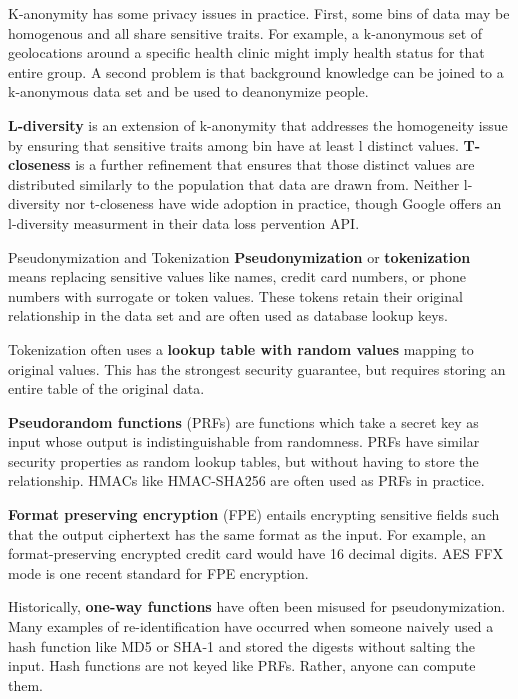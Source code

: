 \documentclass[nobib]{tufte-handout}
\begin{document}
K-anonymity has some privacy issues in practice. First, some bins of data may be
homogenous and all share sensitive traits. For example, a k-anonymous set of
geolocations around a specific health clinic might imply health status for that
entire group. A second problem is that background knowledge can be joined to a
k-anonymous data set and be used to deanonymize people.

\textbf{L-diversity} \cite{DBLP:conf/icde/MachanavajjhalaGKV06} is an extension
of k-anonymity that addresses the homogeneity issue by ensuring that sensitive
traits among bin have at least l distinct values.
\textbf{T-closeness} \cite{DBLP:conf/icde/LiLV07} is a further refinement that
ensures that those distinct values are distributed similarly to the population
that data are drawn from. Neither l-diversity nor t-closeness have wide adoption
in practice, though Google offers an l-diversity measurment in their data loss
pervention API.

Pseudonymization and Tokenization \textbf{Pseudonymization} or
\textbf{tokenization} means replacing sensitive values like names, credit card
numbers, or phone numbers with surrogate or token values. These tokens retain
their original relationship in the data set and are often used as database
lookup keys.

Tokenization often uses a \textbf{lookup table with random values} mapping to
original values. This has the strongest security guarantee, but requires storing
an entire table of the original data.

\textbf{Pseudorandom functions} (PRFs) are functions which take a secret key as
input whose output is indistinguishable from randomness. PRFs have similar
security properties as random lookup tables, but without having to store the
relationship. HMACs like HMAC-SHA256 are often used as PRFs in practice.

\textbf{Format preserving encryption} \cite{DBLP:conf/sacrypt/BellareRRS09} (FPE)
entails encrypting sensitive fields such that the output ciphertext has the same
format as the input. For example, an format-preserving encrypted credit card
would have 16 decimal digits. AES FFX mode \cite{dworkin2016recommendation} is
one recent standard for FPE encryption.

Historically, \textbf{one-way functions} have often been misused for
pseudonymization. Many examples of re-identification have occurred when someone
naively used a hash function like MD5 or SHA-1 and stored the digests without
salting the input. Hash functions are not keyed like PRFs. Rather, anyone can
compute them.
\end{document}
